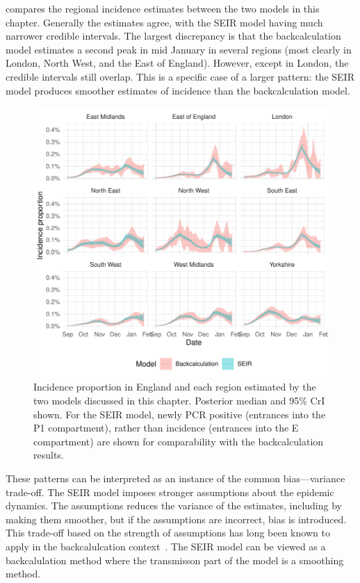 \documentclass[thesis.tex]{subfiles}
\begin{document}
 compares the regional incidence estimates between the two models in this chapter.
Generally the estimates agree, with the SEIR model having much narrower credible intervals.
The largest discrepancy is that the backcalculation model estimates a second peak in mid January in several regions (most clearly in London, North West, and the East of England).
However, except in London, the credible intervals still overlap.
This is a specific case of a larger pattern: the SEIR model produces smoother estimates of incidence than the backcalculation model.
\begin{figure}
    \centering \includegraphics{transmission/compare-regions}
    \caption[Comparing each models estimate of regional incidence.]{%
        Incidence proportion in England and each region estimated by the two models discussed in this chapter.
        Posterior median and 95\% CrI shown.
        For the SEIR model, newly PCR positive (entrances into the P1 compartment), rather than incidence (entrances into the E compartment) are shown for comparability with the backcalculation results.
    }
    \label{transmission:fig:compare-regions}
\end{figure}

These patterns can be interpreted as an instance of the common bias---variance trade-off.
The SEIR model imposes stronger assumptions about the epidemic dynamics.
The assumptions reduces the variance of the estimates, including by making them smoother, but if the assumptions are incorrect, bias is introduced.
This trade-off based on the strength of assumptions has long been known to apply in the backcalulcation context~\autocite[e.g.][section 8.3]{brookmeyerBackcalculation}.
The SEIR model can be viewed as a backcalulation method where the transmisson part of the model is a smoothing method.
\end{document}
